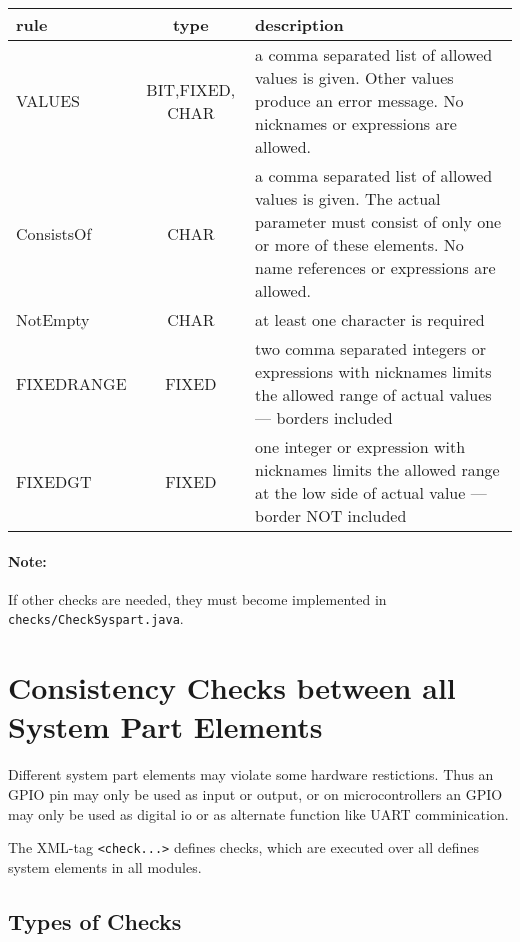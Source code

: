 \begin{tabular}{|l|c|p{8cm}|}
\hline
rule & type & description \\
\hline
VALUES & BIT,FIXED, CHAR &
   a comma separated list of allowed values
   is given. Other values produce an error message. 
No nicknames or expressions are allowed.\\
\hline
ConsistsOf & CHAR &
a comma separated list of allowed values is given. 
The actual parameter must consist of only one or more of these
elements.
No name references or expressions are allowed.\\
\hline
NotEmpty & CHAR & 
   at least one character is required \\   
\hline
FIXEDRANGE & FIXED &
   two comma separated integers or expressions with nicknames
 limits the allowed range
   of actual values --- borders included \\ 
\hline
FIXEDGT & FIXED &
   one integer or expression with nicknames
 limits the allowed range at the low side
   of actual value --- border NOT included \\ 
\hline
\end{tabular}

\paragraph{Note:} If other checks are needed, they must become implemented in 
\verb|checks/CheckSyspart.java|.

\section{Consistency Checks between all System Part Elements}
Different system part elements may violate some hardware restictions.
Thus an GPIO pin may only be used as input or output, or on microcontrollers
an GPIO may only be used as digital io or as alternate function like UART comminication.

The XML-tag \verb|<check...>| defines checks, which are executed
over all defines system elements in all modules.

\subsection{Types of Checks}

